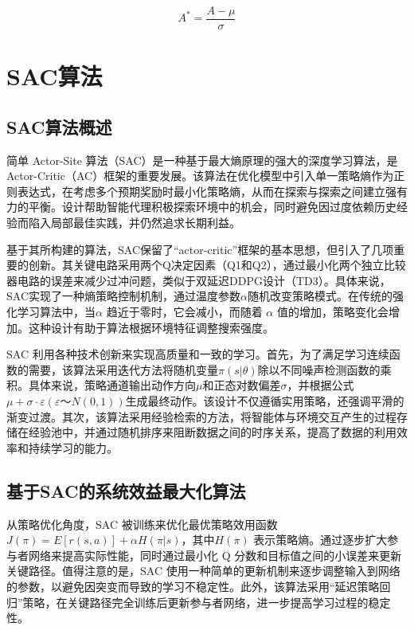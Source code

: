 \begin{equation}
	A^* = \frac{A - \mu}{\sigma}
\end{equation}

\section{SAC算法}

\subsection{SAC算法概述}
简单 Actor-Site 算法（SAC）\cite{zhou2022computation}是一种基于最大熵原理的强大的深度学习算法，是 Actor-Critic（AC）框架的重要发展。该算法在优化模型中引入单一策略熵作为正则表达式，在考虑多个预期奖励时最小化策略熵，从而在探索与探索之间建立强有力的平衡。设计帮助智能代理积极探索环境中的机会，同时避免因过度依赖历史经验而陷入局部最佳实践，并仍然追求长期利益。

基于其所构建的算法，SAC保留了“actor-critic”框架的基本思想，但引入了几项重要的创新。其关键电路采用两个Q决定因素（Q1和Q2），通过最小化两个独立比较器电路的误差来减少过冲问题，类似于双延迟DDPG设计（TD3）。具体来说，SAC实现了一种熵策略控制机制，通过温度参数\(α\)随机改变策略模式。在传统的强化学习算法中，当\( α\) 趋近于零时，它会减小，而随着 \(α\) 值的增加，策略变化会增加。这种设计有助于算法根据环境特征调整搜索强度。

SAC 利用各种技术创新来实现高质量和一致的学习。首先，为了满足学习连续函数的需要，该算法采用迭代方法将随机变量\(π(s|θ)\)除以不同噪声检测函数的乘积。具体来说，策略通道输出动作方向\(μ\)和正态对数偏差\(σ\)，并根据公式\(μ+σ·ε(ε～N(0,1))\)生成最终动作。该设计不仅遵循实用策略，还强调平滑的渐变过渡。其次，该算法采用经验检索的方法，将智能体与环境交互产生的过程存储在经验池中，并通过随机排序来阻断数据之间的时序关系，提高了数据的利用效率和持续学习的能力。

\subsection{基于SAC的系统效益最大化算法}

从策略优化角度，SAC 被训练来优化最优策略效用函数\(J(π) = E[r(s,a)] + αH(π|s)\)，其中\(H(π)\) 表示策略熵。通过逐步扩大参与者网络来提高实际性能，同时通过最小化 Q 分数和目标值之间的小误差来更新关键路径。值得注意的是，SAC 使用一种简单的更新机制来逐步调整输入到网络的参数，以避免因突变而导致的学习不稳定性。此外，该算法采用“延迟策略回归”策略，在关键路径完全训练后更新参与者网络，进一步提高学习过程的稳定性。

